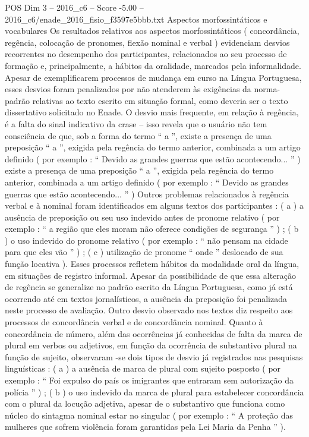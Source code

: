 \begin{textsample}{POS Dim 3 – 2016\_c6 – Score -5.00 – 2016\_c6/enade\_2016\_fisio\_f3597e5bbb.txt}
Aspectos morfossintáticos e vocabulares Os resultados relativos aos aspectos morfossintáticos ( concordância, regência, colocação de pronomes, flexão nominal e verbal ) evidenciam desvios recorrentes no desempenho dos participantes, relacionados ao seu processo de formação e, principalmente, a hábitos da oralidade, marcados pela informalidade.
Apesar de exemplificarem processos de mudança em curso na Língua Portuguesa, esses desvios foram penalizados por não atenderem às exigências da norma-padrão relativas ao texto escrito em situação formal, como deveria ser o texto dissertativo solicitado no Enade.
O desvio mais frequente, em relação à regência, é a falta do sinal indicativo da crase – isso revela que o usuário não tem consciência de que, sob a forma do termo “ a ”, existe a presença de uma preposição “ a ”, exigida pela regência do termo anterior, combinada a um artigo definido ( por exemplo : “ Devido as grandes guerras que estão acontecendo... ” ) existe a presença de uma preposição “ a ”, exigida pela regência do termo anterior, combinada a um artigo definido ( por exemplo : “ Devido as grandes guerras que estão acontecendo... ” ) Outros problemas relacionados à regência verbal e à nominal foram identificados em alguns textos dos participantes : ( a ) a ausência de preposição ou seu uso indevido antes de pronome relativo ( por exemplo : “ a região que eles moram não oferece condições de segurança ” ) ; ( b ) o uso indevido do pronome relativo ( por exemplo : “ não pensam na cidade para que eles vão ” ) ; ( c ) utilização de pronome “ onde ” deslocado de sua função locativa ).
Esses processos refletem hábitos da modalidade oral da língua, em situações de registro informal.
Apesar da possibilidade de que essa alteração de regência se generalize no padrão escrito da Língua Portuguesa, como já está ocorrendo até em textos jornalísticos, a ausência da preposição foi penalizada neste processo de avaliação.
Outro desvio observado nos textos diz respeito aos processos de concordância verbal e de concordância nominal.
Quanto à concordância de número, além das ocorrências já conhecidas de falta da marca de plural em verbos ou adjetivos, em função da ocorrência de substantivo plural na função de sujeito, observaram -se dois tipos de desvio já registrados nas pesquisas linguísticas : ( a ) a ausência de marca de plural com sujeito posposto ( por exemplo : “ Foi expulso do país os imigrantes que entraram sem autorização da polícia ” ) ; ( b ) o uso indevido da marca de plural para estabelecer concordância com o plural da locução adjetiva, apesar de o substantivo que funciona como núcleo do sintagma nominal estar no singular ( por exemplo : “ A proteção das mulheres que sofrem violência foram garantidas pela Lei Maria da Penha ” ).

\end{textsample}
